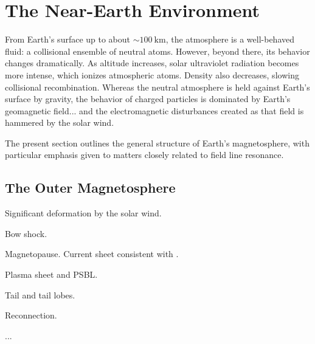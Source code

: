 \section{The Near-Earth Environment}

From Earth's surface up to about $\sim\SI{100}{\km}$, the atmosphere is a well-behaved fluid: a collisional ensemble of neutral atoms. However, beyond there, its behavior changes dramatically. As altitude increases, solar ultraviolet radiation becomes more intense, which ionizes atmospheric atoms. Density also decreases, slowing collisional recombination. Whereas the neutral atmosphere is held against Earth's surface by gravity, the behavior of charged particles is dominated by Earth's geomagnetic field... and the electromagnetic disturbances created as that field is hammered by the solar wind. 

The present section outlines the general structure of Earth's magnetosphere, with particular emphasis given to matters closely related to field line resonance. 

\subsection{The Outer Magnetosphere}











Significant deformation by the solar wind. 

Bow shock. 

Magnetopause. Current sheet consistent with \amplaw. 

Plasma sheet and PSBL. 

Tail and tail lobes. 

Reconnection. 










... \\ \\

